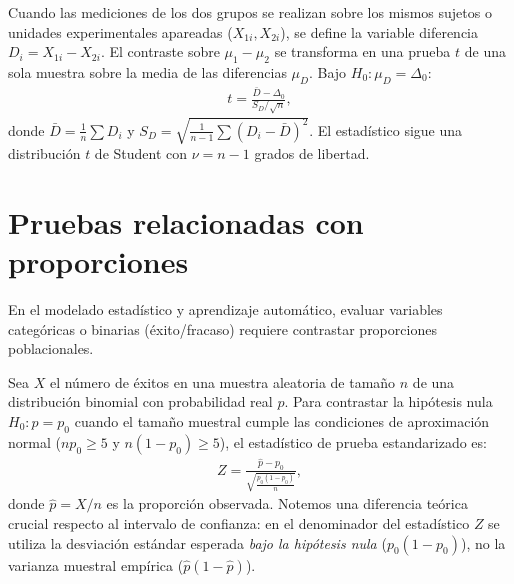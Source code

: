\begin{definicion}
	Cuando las mediciones de los dos grupos se realizan sobre los mismos sujetos o unidades experimentales apareadas ($X_{1i}, X_{2i}$), se define la variable diferencia $D_i = X_{1i} - X_{2i}$. El contraste sobre $\mu_1 - \mu_2$ se transforma en una prueba $t$ de una sola muestra sobre la media de las diferencias $\mu_D$. Bajo $H_0: \mu_D = \Delta_0$:
	\begin{align}
		t = \frac{\bar{D} - \Delta_0}{S_D / \sqrt{n}},
	\end{align}
	donde $\bar{D} = \frac{1}{n}\sum D_i$ y $S_D = \sqrt{\frac{1}{n-1}\sum (D_i - \bar{D})^2}$. El estadístico sigue una distribución $t$ de Student con $\nu = n - 1$ grados de libertad.
\end{definicion}

\section{Pruebas relacionadas con proporciones}

En el modelado estadístico y aprendizaje automático, evaluar variables categóricas o binarias (éxito/fracaso) requiere contrastar proporciones poblacionales.

\begin{teorema}
	Sea $X$ el número de éxitos en una muestra aleatoria de tamaño $n$ de una distribución binomial con probabilidad real $p$. Para contrastar la hipótesis nula $H_0: p = p_0$ cuando el tamaño muestral cumple las condiciones de aproximación normal ($n p_0 \geq 5$ y $n(1-p_0) \geq 5$), el estadístico de prueba estandarizado es:
	\begin{align}
		Z = \frac{\hat{p} - p_0}{\sqrt{\frac{p_0(1-p_0)}{n}}},
	\end{align}
	donde $\hat{p} = X/n$ es la proporción observada. Notemos una diferencia teórica crucial respecto al intervalo de confianza: en el denominador del estadístico $Z$ se utiliza la desviación estándar esperada \emph{bajo la hipótesis nula} ($p_0(1-p_0)$), no la varianza muestral empírica ($\hat{p}(1-\hat{p})$).
\end{teorema}

